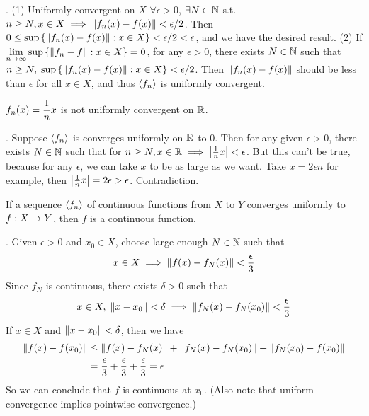 \pf. (1) Uniformly convergent on \(X\) \mimp \(\forall \epsilon > 0\), \(\exists N \in \mathbb{N}\) s.t. \(n \geq N, x\in X \implies \left\lVert f_n(x) - f(x)\right\rVert < \epsilon/2\). Then \(0 \leq \sup\left\{\left\lVert f_n(x) - f(x)\right\rVert : x \in X \right\} < \epsilon/2 < \epsilon\), and we have the desired result.
(2) If \(\displaystyle \lim_{n\rightarrow \infty} \sup \left\{\left\lVert f_n-f\right\rVert: x\in X\right\} = 0\), for any \(\epsilon > 0\), there exists \(N\in \mathbb{N}\) such that \(n\geq N,\; \sup\left\{\left\lVert f_n(x) - f(x)\right\rVert : x \in X \right\} < \epsilon / 2\). Then \(\left\lVert f_n(x) - f(x)\right\rVert\) should be less than \(\epsilon\) for all \(x\in X\), and thus \(\left\langle f_n \right\rangle\) is uniformly convergent.

 \(\displaystyle f_n(x) = \frac{1}{n}x\) is not uniformly convergent on \(\mathbb{R}\).

\pf. Suppose \(\left\langle f_n \right\rangle\) is converges uniformly on \(\mathbb{R}\) to 0. Then for any given \(\epsilon > 0\), there exists \(N\in\mathbb{N}\) such that for \(n\geq N, x\in \mathbb{R} \implies \left|\frac{1}{n}x\right| < \epsilon\). But this can't be true, because for any \(\epsilon\), we can take \(x\) to be as large as we want. Take \(x = 2\epsilon n\) for example, then \(\left|\frac{1}{n}x\right| = 2\epsilon > \epsilon\). Contradiction.

 If a sequence \(\left\langle f_n \right\rangle\) of continuous functions from \(X\) to \(Y\) converges uniformly to \(f: X \rightarrow Y\), then \(f\) is a continuous function.

\pf. Given \(\epsilon > 0\) and \(x_0 \in X\), choose large enough \(N\in\mathbb{N}\) such that
\[
    x \in X \implies \left\lVert f(x) - f_N(x)\right\rVert < \frac{\epsilon}{3}
\]
Since \(f_N\) is continuous, there exists \(\delta > 0\) such that
\[
    x\in X,\; \left\lVert x - x_0\right\rVert < \delta \implies \left\lVert f_N(x) - f_N(x_0)\right\rVert < \frac{\epsilon}{3}
\]
If \(x\in X\) and \(\left\lVert x - x_0\right\rVert < \delta\), then we have
\[
    \begin{aligned}
        \left\lVert f(x) - f(x_0)\right\rVert & \leq \left\lVert f(x) - f_N(x)\right\rVert + \left\lVert f_N(x) - f_N(x_0)\right\rVert + \left\lVert f_N(x_0) -f(x_0)\right\rVert \\
                             & = \frac{\epsilon}{3} + \frac{\epsilon}{3} + \frac{\epsilon}{3} = \epsilon
    \end{aligned}
\]
So we can conclude that \(f\) is continuous at \(x_0\). (Also note that uniform convergence implies pointwise convergence.)

